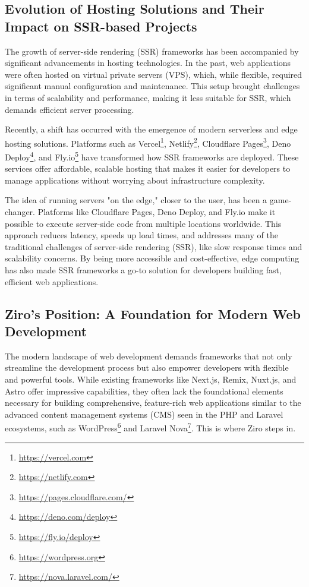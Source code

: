 \subsection{Evolution of Hosting Solutions and Their Impact on SSR-based Projects}

The growth of server-side rendering (SSR) frameworks has been accompanied by significant advancements in hosting technologies. In the past, web applications were often hosted on virtual private servers (VPS), which, while flexible, required significant manual configuration and maintenance. This setup brought challenges in terms of scalability and performance, making it less suitable for SSR, which demands efficient server processing.

Recently, a shift has occurred with the emergence of modern serverless and edge hosting solutions. Platforms such as Vercel\footnote{\url{https://vercel.com}}, Netlify\footnote{\url{https://netlify.com}}, Cloudflare Pages\footnote{\url{https://pages.cloudflare.com/}}, Deno Deploy\footnote{\url{https://deno.com/deploy}}, and Fly.io\footnote{\url{https://fly.io/deploy}} have transformed how SSR frameworks are deployed. These services offer affordable, scalable hosting that makes it easier for developers to manage applications without worrying about infrastructure complexity.

The idea of running servers "on the edge," closer to the user, has been a game-changer. Platforms like Cloudflare Pages, Deno Deploy, and Fly.io make it possible to execute server-side code from multiple locations worldwide. This approach reduces latency, speeds up load times, and addresses many of the traditional challenges of server-side rendering (SSR), like slow response times and scalability concerns. By being more accessible and cost-effective, edge computing has also made SSR frameworks a go-to solution for developers building fast, efficient web applications.


\subsection{Ziro’s Position: A Foundation for Modern Web Development}

The modern landscape of web development demands frameworks that not only streamline the development process but also empower developers with flexible and powerful tools. While existing frameworks like Next.js, Remix, Nuxt.js, and Astro offer impressive capabilities, they often lack the foundational elements necessary for building comprehensive, feature-rich web applications similar to the advanced content management systems (CMS) seen in the PHP and Laravel ecosystems, such as WordPress\footnote{\url{https://wordpress.org}} and Laravel Nova\footnote{\url{https://nova.laravel.com/}}. This is where Ziro steps in.

